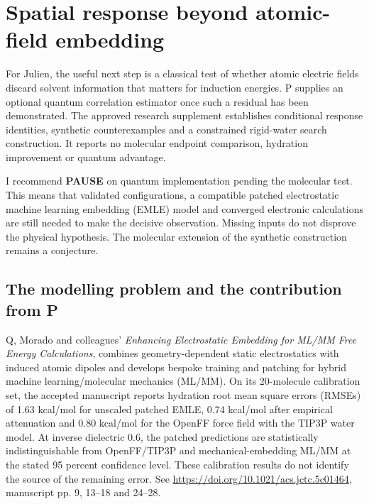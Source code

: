 \documentclass{article}
\date{}
\begin{document}
\section{Spatial response beyond atomic-field embedding}

For Julien, the useful next step is a classical test of whether atomic electric fields discard solvent information that matters for induction energies. P supplies an optional quantum correlation estimator once such a residual has been demonstrated. The approved research supplement establishes conditional response identities, synthetic counterexamples and a constrained rigid-water search construction. It reports no molecular endpoint comparison, hydration improvement or quantum advantage.

I recommend \textbf{PAUSE} on quantum implementation pending the molecular test. This means that validated configurations, a compatible patched electrostatic machine learning embedding (EMLE) model and converged electronic calculations are still needed to make the decisive observation. Missing inputs do not disprove the physical hypothesis. The molecular extension of the synthetic construction remains a conjecture.

\subsection{The modelling problem and the contribution from P}

Q, Morado and colleagues' \emph{Enhancing Electrostatic Embedding for ML/MM Free Energy Calculations}, combines geometry-dependent static electrostatics with induced atomic dipoles and develops bespoke training and patching for hybrid machine learning/molecular mechanics (ML/MM). On its 20-molecule calibration set, the accepted manuscript reports hydration root mean square errors (RMSEs) of 1.63 kcal/mol for unscaled patched EMLE, 0.74 kcal/mol after empirical attenuation and 0.80 kcal/mol for the OpenFF force field with the TIP3P water model. At inverse dielectric 0.6, the patched predictions are statistically indistinguishable from OpenFF/TIP3P and mechanical-embedding ML/MM at the stated 95 percent confidence level. These calibration results do not identify the source of the remaining error. See \url{https://doi.org/10.1021/acs.jctc.5c01464}, manuscript pp. 9, 13--18 and 24--28.
\end{document}

